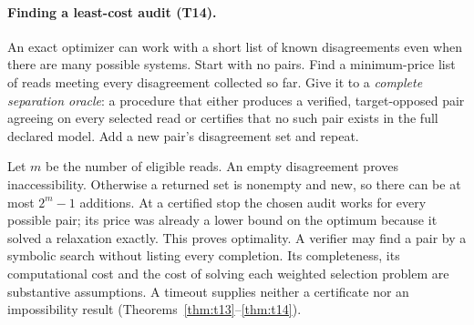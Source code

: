 \paragraph{Finding a least-cost audit (T14).}\label{body:oracle}
An exact optimizer can work with a short list of known disagreements even when there are many possible systems. Start with no pairs. Find a minimum-price list of reads meeting every disagreement collected so far. Give it to a \emph{complete separation oracle}: a procedure that either produces a verified, target-opposed pair agreeing on every selected read or certifies that no such pair exists in the full declared model. Add a new pair's disagreement set and repeat.

Let \(m\) be the number of eligible reads. An empty disagreement proves inaccessibility. Otherwise a returned set is nonempty and new, so there can be at most \(2^m-1\) additions. At a certified stop the chosen audit works for every possible pair; its price was already a lower bound on the optimum because it solved a relaxation exactly. This proves optimality. A verifier may find a pair by a symbolic search without listing every completion. Its completeness, its computational cost and the cost of solving each weighted selection problem are substantive assumptions. A timeout supplies neither a certificate nor an impossibility result (Theorems~\ref{thm:t13}--\ref{thm:t14}).
